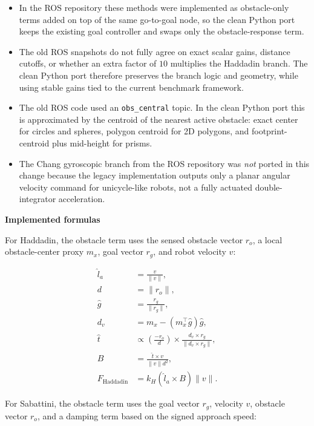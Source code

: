 \documentclass[11pt]{article}
\begin{document}
\begin{itemize}[leftmargin=*]
  \item In the ROS repository these methods were implemented as obstacle-only terms added on top of the same go-to-goal node, so the clean Python port keeps the existing goal controller and swaps only the obstacle-response term.
  \item The old ROS snapshots do not fully agree on exact scalar gains, distance cutoffs, or whether an extra factor of \(10\) multiplies the Haddadin branch. The clean Python port therefore preserves the branch logic and geometry, while using stable gains tied to the current benchmark framework.
  \item The old ROS code used an \texttt{obs\_central} topic. In the clean Python port this is approximated by the centroid of the nearest active obstacle: exact center for circles and spheres, polygon centroid for 2D polygons, and footprint-centroid plus mid-height for prisms.
  \item The Chang gyroscopic branch from the ROS repository was \emph{not} ported in this change because the legacy implementation outputs only a planar angular velocity command for unicycle-like robots, not a fully actuated double-integrator acceleration.
\end{itemize}

\textbf{Implemented formulas}

For Haddadin, the obstacle term uses the sensed obstacle vector \(r_o\), a local obstacle-center proxy \(m_x\), goal vector \(r_g\), and robot velocity \(v\):

\begin{align}
\hat{l}_a &= \frac{v}{\lVert v \rVert}, \\
d &= \lVert r_o \rVert, \\
\hat{g} &= \frac{r_g}{\lVert r_g \rVert}, \\
d_v &= m_x - (m_x^\top \hat{g})\hat{g}, \\
\hat{t} &\propto \left(\frac{-r_o}{d}\right) \times \frac{d_v \times r_g}{\lVert d_v \times r_g \rVert}, \\
B &= \frac{\hat{t} \times v}{\lVert v \rVert d^2}, \\
F_{\text{Haddadin}} &= k_H \left(\hat{l}_a \times B\right)\lVert v \rVert .
\end{align}

For Sabattini, the obstacle term uses the goal vector \(r_g\), velocity \(v\), obstacle vector \(r_o\), and a damping term based on the signed approach speed:
\end{document}
